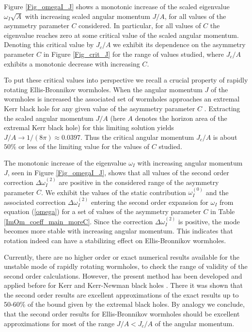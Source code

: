 \documentclass[aps,prd,12pt,superscriptaddress]{revtex4-2}
\begin{document}
Figure \ref{Fig_omegaI_J} shows a monotonic increase of the scaled eigenvalue $\omega_I \sqrt{A}$ with increasing scaled angular momentum $J/A$, for all values of the asymmetry parameter $C$ considered.
In particular, for all values of $C$ the eigenvalue reaches zero at some critical value of the scaled angular momentum.
Denoting this critical value by $J_c/A$ we exhibit its dependence on the asymmetry parameter $C$ in Figure \ref{Fig_crit_J} for the range of values studied, where $J_c/A$ exhibits a monotonic decrease with increasing $C$.

To put these critical values into perspective we recall a crucial property of rapidly rotating Ellis-Bronnikov wormholes.
When the angular momentum $J$ of the wormholes is increased the associated set of wormholes approaches an extremal Kerr black hole for any given value of the asymmetry parameter $C$ \cite{Kleihaus:2014dla,Chew:2016epf}.
Extracting the scaled angular momentum $J/A$ (here $A$ denotes the horizon area of the extremal Kerr black hole) for this limiting solution yields $J/A\to 1/(8\pi) \approx 0.0397$.
Thus the critical angular momentum $J_c/A$ is about $50\%$ or less of the limiting value for the values of $C$ studied.

The monotonic increase of the eigenvalue $\omega_I$ with increasing angular momentum $J$, seen in Figure \ref{Fig_omegaI_J}, shows that all values of the second order correction $\Delta\omega^{(2)}_I$ are positive in the considered range of the asymmetry parameter $C$.
We exhibit the values of the static contribution $\omega^{(0)}_I$ and the associated correction $\Delta\omega^{(2)}_I$ entering the second order expansion for $\omega_I$ from equation (\ref{omega}) for a set of values of the asymmetry parameter $C$ in Table \ref{ImOm_coeff_main_moreC}.
Since the correction $\Delta\omega^{(2)}_I$ is positive, the mode becomes more stable with increasing angular momentum.
This indicates that rotation indeed can have a stabilizing effect on Ellis-Bronnikov wormholes. 
 
Currently, there are no higher order or exact numerical results available for 
the unstable mode of
rapidly rotating wormholes, to check the range of validity of the second order calculations.
However, the present method has been developed and applied before for Kerr and Kerr-Newman black holes \cite{Blazquez-Salcedo:2022eik}.
There it was shown that the second order results are excellent approximations of the exact results up to 50-60\% of the bound given by the extremal black holes.
By analogy we conclude, that the second order results for Ellis-Bronnikov wormholes should be excellent approximations for most of the range $J/A < J_c/A$ of the angular momentum.
 
\end{document}
